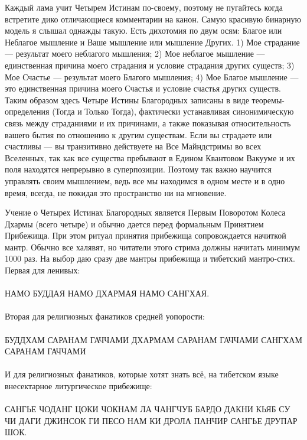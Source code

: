 Каждый лама учит Четырем Истинам по-своему, поэтому не пугайтесь
когда встретите дико отличающиеся комментарии на канон. Самую
красивую бинарную модель я слышал однажды такую. Есть дихотомия
по двум осям: Благое или Неблагое мышление и Ваше мышление или
мышление Других. 1) Мое страдание — результат моего неблагого
мышления; 2) Мое неблагое мышление — единственная причина
моего страдания и условие страдания других существ; 3)
Мое Счастье — результат моего Благого мышления; 4) Мое
Благое мышление — это единственная причина моего Счастья
и условие счастья других существ. Таким образом здесь
Четыре Истины Благородных записаны в виде теоремы-определения
(Тогда и Только Тогда), фактически устанавливая синонимическую
связь между страданиями и их причинами, а также показывая
относительность вашего бытия по отношению к другим существам.
Если вы страдаете или счастливы — вы транзитивно действуете
на Все Майндстримы во всех Вселенных, так как все существа
пребывают в Едином Квантовом Вакууме и их поля находятся
непрерывно в суперпозиции. Поэтому так важно научится управлять
своим мышлением, ведь все мы находимся в одном месте и в одно
время, всегда, не покидая это пространство ни на мгновение.

Учение о Четырех Истинах Благородных является Первым Поворотом
Колеса Дхармы (всего четыре) и обычно дается перед формальным
Принятием Прибежища. При этом ритуал принятия прибежища
сопровождается начиткой мантр. Обычно все халявят, но читатели
этого стрима должны начитать минимум 1000 раз. На выбор даю
сразу две мантры прибежища и тибетский мантро-стих.
\newpage
Первая для ленивых:
\\
\\
НАМО БУДДАЯ НАМО ДХАРМАЯ НАМО САНГХАЯ.
\\
\\
Вторая для религиозных фанатиков средней уопорости:
\\
\\
БУДДХАМ САРАНАМ ГАЧЧАМИ ДХАРМАМ САРАНАМ ГАЧЧАМИ САНГХАМ САРАНАМ ГАЧЧАМИ
\\
\\
И для религиозных фанатиков, которые хотят знать всё,
на тибетском языке внесектарное литургическое прибежище:
\\
\\
САНГЬЕ ЧОДАНГ ЦОКИ ЧОКНАМ ЛА ЧАНГЧУБ БАРДО ДАКНИ
КЬЯБ СУ ЧИ ДАГИ ДЖИНСОК ГИ ПЕСО НАМ КИ ДРОЛА ПАНЧИР
САНГЬЕ ДРУПАР ШОК.
